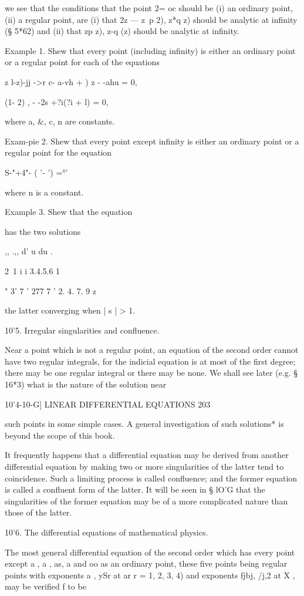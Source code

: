 we see that the conditions that the point 2= oc should be (i) an
ordinary point, (ii) a regular point, are (i) that 2z — z~p 2), z*q z)
should be analytic at infinity (§ 5*62) and (ii) that zp z), z-q (z)
should be analytic at infinity.

Example 1. Shew that every point (including infinity) is either an
ordinary point or a regular point for each of the equations

z l-z)-jj ->r c- a-vh + ) z - -ahu = 0,

(1- 2) , - -2s +?i(?i + l) = 0,

where a, \&, c, n are constants.

Exam-pie 2. Shew that every point except infinity is either an
ordinary point or a regular point for the equation

 S-"+4"- ( '- ') =°'

where n is a constant.

Example 3. Shew that the equation

has the two solutions

,, .,, d' u du .

2\ 1 i i 3.4.5.6 1

 " 3' 7 ' 277 7 ' 2. 4. 7. 9 z

the latter converging when | s | > 1.

10'5. Irregular singularities and confluence.

Near a point which is not a regular point, an equation of the second
order cannot have two regular integrals, for the indicial equation is
at most of the first degree; there may be one regular integral or
there may be none. We shall see later (e.g. § 16*3) what is the nature
of the solution near

10'4-10-G] LINEAR DIFFERENTIAL EQUATIONS 203

such points in some simple cases. A general investigation of such
solutions* is beyond the scope of this book.

It frequently happens that a differential equation may be derived from
another differential equation by making two or more singularities of
the latter tend to coincidence. Such a limiting process is called
confluence; and the former equation is called a confluent form of the
latter. It will be seen in § lO'G that the singularities of the former
equation may be of a more complicated nature than those of the latter.

10'6. The differential equations of mathematical physics.

The most general differential equation of the second order which has
every point except a , a , as, a and oo as an ordinary point, these
five points being regular points with exponents a , ySr at ar r = 1,
2, 3, 4) and exponents fjbj, /j,2 at X , may be verified f to be

